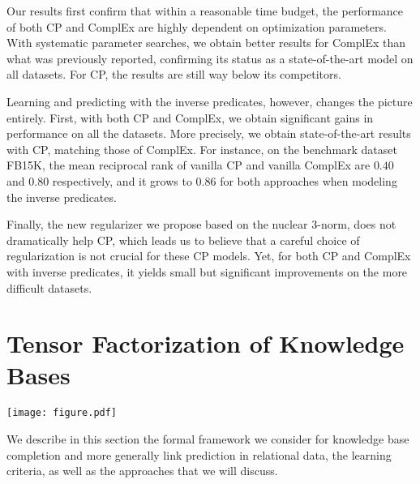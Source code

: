 \documentclass{article}
\newcommand{\CP}{{CP}\xspace}
\newcommand{\complex}{{ComplEx}\xspace}
\newcommand{\fb}{{FB15K}\xspace}
\begin{document}
Our results first confirm that within a reasonable time budget, the performance of both \CP and \complex are highly dependent on optimization parameters. With systematic parameter searches, we obtain better results for \complex than what was previously reported, confirming its status as a state-of-the-art model on all datasets. For \CP, the results are still way below its competitors. 

Learning and predicting with the inverse predicates, however, changes the picture entirely. First, with both \CP and \complex, we obtain significant gains in performance on all the datasets. More precisely, we obtain state-of-the-art results with \CP, matching those of \complex. For instance, on the benchmark dataset \fb \citep{bordes_translating_2013}, the mean reciprocal rank of vanilla \CP and vanilla \complex are $0.40$ and $0.80$ respectively, and it grows to $0.86$ for both approaches when modeling the inverse predicates. 

Finally, the new regularizer we propose based on the nuclear $3$-norm, does not dramatically help \CP, which leads us to believe that a careful choice of regularization is not crucial for these \CP models. Yet, for both \CP and \complex with inverse predicates, it yields small but significant improvements on the more difficult datasets.

\section{Tensor Factorization of Knowledge Bases}
\begin{figure*}
\centering
\texttt{[image: figure.pdf]}
\caption{(a) On the left, the link between the score of a triple (i,j,k) and the tensor estimated via \CP. (b) In the middle, the two type of fiber losses that we will consider. (c) On the right, our semantically invariant reformulation, the first-mode fibers become third-mode fibers of the reciprocal half of the tensor.}
\label{fig:tensors}
\end{figure*}
We describe in this section the formal framework we consider for knowledge base completion and more generally link prediction in relational data, the learning criteria, as well as the approaches that we will discuss.
\end{document}
